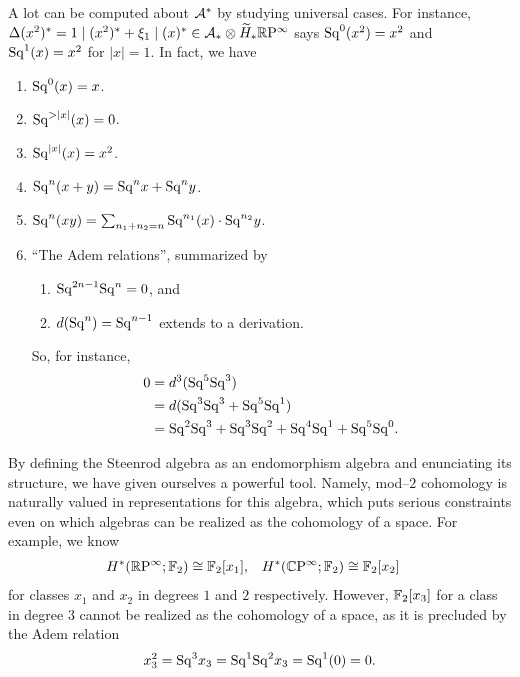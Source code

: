 \begin{remark}
A lot can be computed about $\mathcal A^*$ by studying universal cases.
For instance, $\Delta(x^2)^* = 1 \mid (x^2)^* + \xi_1 \mid (x)^* \in \mathcal A_* \otimes \widetilde H_* \mathbb R \mathrm{P}^\infty$ says $\mathrm{Sq}^0(x^2) = x^2$ and $\mathrm{Sq}^1(x) = x^2$ for $|x| = 1$.
In fact, we have
\begin{enumerate}
    \item $\mathrm{Sq}^0(x) = x$.
    \item $\mathrm{Sq}^{>|x|}(x) = 0$.
    \item $\mathrm{Sq}^{|x|}(x) = x^2$.
    \item $\mathrm{Sq}^n(x+y) = \mathrm{Sq}^n x + \mathrm{Sq}^n y$.
    \item $\mathrm{Sq}^n(xy) = \sum_{n_1 + n_2 = n} \mathrm{Sq}^{n_1}(x) \cdot \mathrm{Sq}^{n_2} y$.
    \item ``The Adem relations'', summarized by
    \begin{enumerate}
        \item $\mathrm{Sq}^{2n-1} \mathrm{Sq}^n = 0$, and
        \item $d(\mathrm{Sq}^n) = \mathrm{Sq}^{n-1}$ extends to a derivation.
    \end{enumerate}
    So, for instance,
    \begin{align*}
    0 & = d^3(\mathrm{Sq}^5 \mathrm{Sq}^3) \\
    & = d(\mathrm{Sq}^3\mathrm{Sq}^3 + \mathrm{Sq}^5 \mathrm{Sq}^1) \\
    & = \mathrm{Sq}^2 \mathrm{Sq}^3 + \mathrm{Sq}^3 \mathrm{Sq}^2 + \mathrm{Sq}^4 \mathrm{Sq}^1 + \mathrm{Sq}^5 \mathrm{Sq}^0.
    \end{align*}
\end{enumerate}
\end{remark}

\begin{remark}
By defining the Steenrod algebra as an endomorphism algebra and enunciating its structure, we have given ourselves a powerful tool.
Namely, mod--$2$ cohomology is naturally valued in representations for this algebra, which puts serious constraints even on which algebras can be realized as the cohomology of a space.
For example, we know
\begin{align*}
H^*(\mathbb R \mathrm{P}^\infty; \mathbb F_2) & \cong \mathbb F_2[x_1], &
H^*(\mathbb C \mathrm{P}^\infty; \mathbb F_2) & \cong \mathbb F_2[x_2]
\end{align*}
for classes $x_1$ and $x_2$ in degrees $1$ and $2$ respectively.
However, $\mathbb F_2[x_3]$ for a class in degree $3$ cannot be realized as the cohomology of a space, as it is precluded by the Adem relation \[x_3^2 = \mathrm{Sq}^3 x_3 = \mathrm{Sq}^1 \mathrm{Sq}^2 x_3 = \mathrm{Sq}^1(0) = 0.\]
\end{remark}




